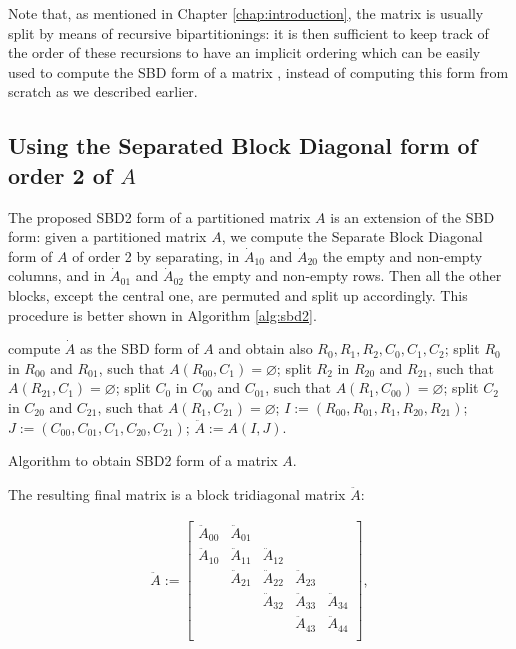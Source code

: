 Note that, as mentioned in Chapter \ref{chap:introduction}, the matrix is usually split by means of recursive bipartitionings: it is then sufficient to keep track of the order of these recursions to have an implicit ordering which can be easily used to compute the SBD form of a matrix \cite{yzelman_cache}, instead of computing this form from scratch as we described earlier.

\subsection{Using the Separated Block Diagonal form of order 2 of $A$} \label{sec:sbd2}

The proposed SBD2 form of a partitioned matrix $A$ is an extension of the SBD form: given a partitioned matrix $A$, we compute the Separate Block Diagonal form of $A$ of order 2 by separating, in $\dot{A}_{10}$ and $\dot{A}_{20}$ the empty and non-empty columns, and in $\dot{A}_{01}$ and $\dot{A}_{02}$ the empty and non-empty rows. Then all the other blocks, except the central one, are permuted and split up accordingly. This procedure is better shown in Algorithm \ref{alg:sbd2}. 

\begin{algorithm}[h]
	\begin{algorithmic}
		\State compute $\dot{A}$ as the SBD form of $A$ and obtain also $R_0,R_1,R_2,C_0,C_1,C_2$;
		\State split $R_0$ in $R_{00}$ and $R_{01}$, such that $A(R_{00},C_1) = \varnothing$;
		\State split $R_2$ in $R_{20}$ and $R_{21}$, such that $A(R_{21},C_1) = \varnothing$;
		\State split $C_0$ in $C_{00}$ and $C_{01}$, such that $A(R_1,C_{00}) = \varnothing$;
		\State split $C_2$ in $C_{20}$ and $C_{21}$, such that $A(R_1,C_{21}) = \varnothing$;
		\State $I:= (R_{00},R_{01},R_1,R_{20},R_{21})$;
		\State $J:= (C_{00},C_{01},C_1,C_{20},C_{21})$;
		\State $\ddot{A} := A(I,J)$.
	\end{algorithmic}
	\caption{Algorithm to obtain SBD2 form of a matrix $A$.} \label{alg:sbd2}
\end{algorithm} 

The resulting final matrix is a block tridiagonal matrix $\ddot{A}$:

\begin{align}
	\ddot{A} := \begin{bmatrix}
		\ddot{A}_{00} & \ddot{A}_{01} & & & \\
		\ddot{A}_{10} & \ddot{A}_{11} & \ddot{A}_{12} & & \\
		& \ddot{A}_{21} & \ddot{A}_{22} & \ddot{A}_{23} & \\
		& & \ddot{A}_{32} & \ddot{A}_{33} & \ddot{A}_{34} \\
		& & & \ddot{A}_{43} & \ddot{A}_{44} \\
	\end{bmatrix},
	\label{eq:sbd2}
\end{align}

